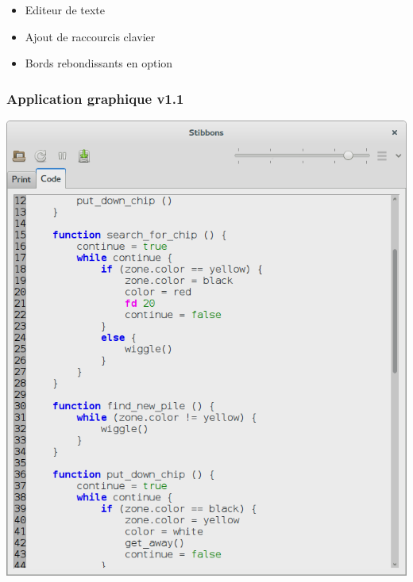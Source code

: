 \begin{frame}
\begin{itemize}
	\item Editeur de texte
	\item Ajout de raccourcis clavier
	\item Bords rebondissants en option
\end{itemize}
\end{frame}

\begin{frame}
\frametitle{Application graphique v1.1}
\begin{center}
\includegraphics[scale=0.16]{doc/Presentation/screenshot/stibbons-0-5-2.png}
~~~~~~~~

\end{center}
\end{frame}
